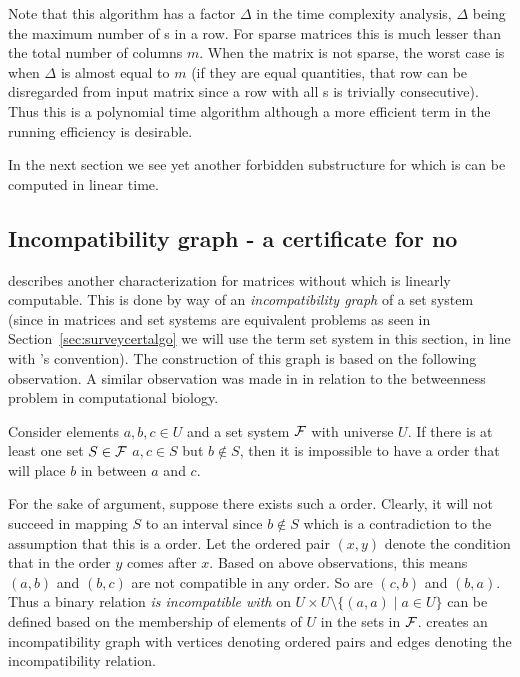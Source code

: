 Note that this algorithm has a factor $\Delta$ in the time complexity
analysis, $\Delta$ being the maximum number of {\un}s in a row. For
sparse matrices this is much lesser than the total number of columns
$m$. When the matrix is not sparse, the worst case is when $\Delta$ is
almost equal to $m$ (if they are equal quantities, that row can be
disregarded from input matrix since a row with all {\un}s is trivially
consecutive). Thus this is a polynomial time algorithm although a more
efficient term in the running efficiency is desirable.

In the next section we see yet another forbidden substructure for \COP
which is can be computed in linear time.

\subsection{Incompatibility graph - a certificate for no \COP}
\label{sec:incompatibilitygr}

\cite{mcc04} describes another characterization for matrices without
\COP which is linearly computable. This is done by way of an {\em
  incompatibility graph} of a set system (since \COP in matrices and
set systems are equivalent problems as seen in
Section~\ref{sec:surveycertalgo} we will use the term set system in
this section, in line with \cite{mcc04}'s convention). The
construction of this graph is based on the following observation. A
similar observation was made in \cite{co98} in relation to the
betweenness problem in computational biology.

\begin{observation} 
  Consider elements $a, b, c \in U$ and a set system ${\cal F}$ with
  universe $U$. If there is at least one set $S \in {\cal F}$ \stt $a, c
  \in S$ but $b \notin S$, then it is impossible to have a \COP order
  that will place $b$ in between $a$ and $c$. 
\end{observation}

For the sake of argument, suppose there exists such a \COP
order. Clearly, it will not succeed in mapping $S$ to an interval
since $b \notin S$ which is a contradiction to the assumption that
this is a \COP order.  Let the ordered pair $(x,y)$ denote the
condition that in the \COP order $y$ comes after $x$. Based on above
observations, this means $(a,b)$ and $(b,c)$ are not compatible in any
\COP order. So are $(c,b)$ and $(b,a)$.  Thus a binary relation {\em
  is incompatible with} on $U \times U \setminus \{(a,a) \mid a \in
U\}$ can be defined based on the membership of elements of $U$ in the
sets in ${\cal F}$.  \cite{mcc04} creates an incompatibility graph with
vertices denoting ordered pairs and edges denoting the incompatibility
relation.

